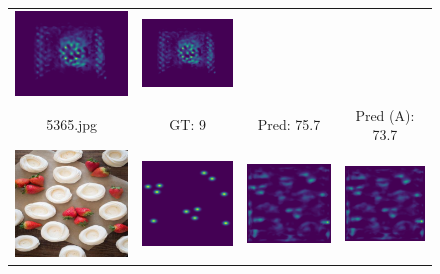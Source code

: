 \begin{figure}[htb]
\begin{tabular}{cccc}
		\includegraphics[width=0.24\linewidth]{fig/5365_pred.png} &
		\includegraphics[width=0.24\linewidth]{fig/5365_pred_adapt.png} \\
		5365.jpg & GT: 9 & Pred: 75.7 & Pred (A): 73.7 \\
		\includegraphics[width=0.24\linewidth]{fig/4885_img.png} &
		\includegraphics[width=0.24\linewidth]{fig/4885_gt.png} &
		\includegraphics[width=0.24\linewidth]{fig/4885_pred.png} &
		\includegraphics[width=0.24\linewidth]{fig/4885_pred_adapt.png} \\ 

\end{tabular}
\end{figure}
